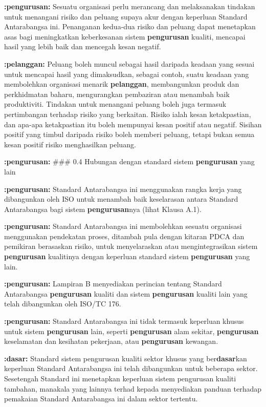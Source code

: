 \documentclass{article}
\begin{document}
\textbf{:pengurusan:} Sesuatu organisasi perlu merancang dan melaksanakan tindakan untuk menangani risiko dan
peluang supaya akur dengan keperluan Standard Antarabangsa ini. Penanganan kedua-dua
risiko dan peluang dapat menetapkan asas bagi meningkatkan keberkesanan sistem
\textbf{pengurusan} kualiti, mencapai hasil yang lebih baik dan mencegah kesan negatif.

\textbf{:pelanggan:} Peluang boleh muncul sebagai hasil daripada keadaan yang sesuai untuk mencapai hasil
yang dimaksudkan, sebagai contoh, suatu keadaan yang membolehkan organisasi menarik
\textbf{pelanggan}, membangunkan produk dan perkhidmatan baharu, mengurangkan pembaziran
atau menambah baik produktiviti. Tindakan untuk menangani peluang boleh juga termasuk
pertimbangan terhadap risiko yang berkaitan. Risiko ialah kesan ketakpastian, dan apa-apa
ketakpastian itu boleh mempunyai kesan positif atau negatif. Sisihan positif yang timbul
daripada risiko boleh memberi peluang, tetapi bukan semua kesan positif risiko menghasilkan
peluang.

\textbf{:pengurusan:} \#\#\# 0.4 Hubungan dengan standard sistem \textbf{pengurusan} yang lain

\textbf{:pengurusan:} Standard Antarabangsa ini menggunakan rangka kerja yang dibangunkan oleh ISO untuk
menambah baik keselarasan antara Standard Antarabangsa bagi sistem \textbf{pengurusan}nya
(lihat Klausa A.1).

\textbf{:pengurusan:} Standard Antarabangsa ini membolehkan sesuatu organisasi menggunakan pendekatan
proses, ditambah pula dengan kitaran PDCA dan pemikiran berasaskan risiko, untuk
menyelaraskan atau mengintegrasikan sistem \textbf{pengurusan} kualitinya dengan keperluan
standard sistem \textbf{pengurusan} yang lain.

\textbf{:pengurusan:} Lampiran B menyediakan perincian tentang Standard Antarabangsa \textbf{pengurusan} kualiti dan
sistem \textbf{pengurusan} kualiti lain yang telah dibangunkan oleh ISO/TC 176.

\textbf{:pengurusan:} Standard Antarabangsa ini tidak termasuk keperluan khusus untuk sistem \textbf{pengurusan} lain,
seperti \textbf{pengurusan} alam sekitar, \textbf{pengurusan} keselamatan dan kesihatan pekerjaan, atau
\textbf{pengurusan} kewangan.

\textbf{:dasar:} Standard sistem pengurusan kualiti sektor khusus yang ber\textbf{dasar}kan keperluan Standard
Antarabangsa ini telah dibangunkan untuk beberapa sektor. Sesetengah Standard ini
menetapkan keperluan sistem pengurusan kualiti tambahan, manakala yang lainnya terhad
kepada menyediakan panduan terhadap pemakaian Standard Antarabangsa ini dalam sektor
tertentu.
\end{document}
